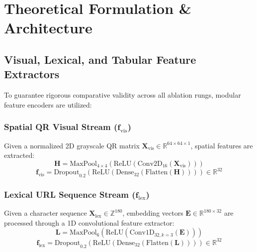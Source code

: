 \documentclass[conference]{IEEEtran}
\begin{document}
\section{Theoretical Formulation \& Architecture}

\subsection{Visual, Lexical, and Tabular Feature Extractors}
To guarantee rigorous comparative validity across all ablation rungs, modular feature encoders are utilized:

\subsubsection{Spatial QR Visual Stream ($\mathbf{f}_{\text{vis}}$)}
Given a normalized 2D grayscale QR matrix $\mathbf{X}_{\text{vis}} \in \mathbb{R}^{64 \times 64 \times 1}$, spatial features are extracted:
\begin{equation}
\mathbf{H} = \text{MaxPool}_{4\times 4}(\text{ReLU}(\text{Conv2D}_{16}(\mathbf{X}_{\text{vis}})))
\end{equation}
\begin{equation}
\mathbf{f}_{\text{vis}} = \text{Dropout}_{0.2}(\text{ReLU}(\text{Dense}_{32}(\text{Flatten}(\mathbf{H})))) \in \mathbb{R}^{32}
\end{equation}

\subsubsection{Lexical URL Sequence Stream ($\mathbf{f}_{\text{lex}}$)}
Given a character sequence $\mathbf{X}_{\text{lex}} \in \mathbb{Z}^{180}$, embedding vectors $\mathbf{E} \in \mathbb{R}^{180 \times 32}$ are processed through a 1D convolutional feature extractor:
\begin{equation}
\mathbf{L} = \text{MaxPool}_6(\text{ReLU}(\text{Conv1D}_{32, k=3}(\mathbf{E})))
\end{equation}
\begin{equation}
\mathbf{f}_{\text{lex}} = \text{Dropout}_{0.2}(\text{ReLU}(\text{Dense}_{32}(\text{Flatten}(\mathbf{L})))) \in \mathbb{R}^{32}
\end{equation}
\end{document}
